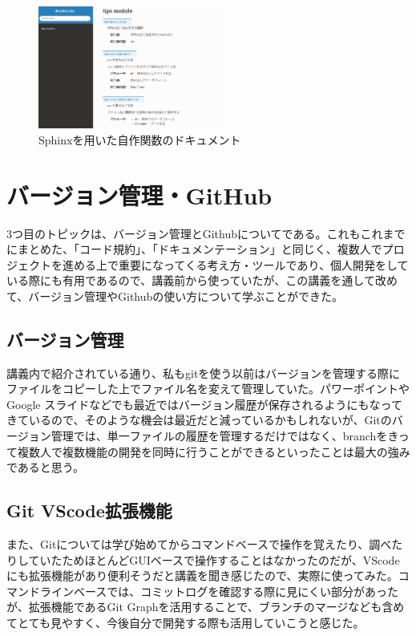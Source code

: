 \documentclass[12pt]{jsarticle}
\begin{document}
\begin{figure}[htbp]
  \begin{center}
    \includegraphics[width=6.0cm]{./sphinx.png}
    \caption{Sphinxを用いた自作関数のドキュメント}
    \label{fig:sphinx}
  \end{center}
\end{figure}



\newpage
\section{バージョン管理・GitHub}
3つ目のトピックは、バージョン管理とGithubについてである。これもこれまでにまとめた、「コード規約」、「ドキュメンテーション」と同じく、複数人でプロジェクトを進める上で重要になってくる考え方・ツールであり、個人開発をしている際にも有用であるので、講義前から使っていたが、この講義を通して改めて、バージョン管理やGithubの使い方について学ぶことができた。

\subsection{バージョン管理}
講義内で紹介されている通り、私もgitを使う以前はバージョンを管理する際にファイルをコピーした上でファイル名を変えて管理していた。パワーポイントやGoogle スライドなどでも最近ではバージョン履歴が保存されるようにもなってきているので、そのような機会は最近だと減っているかもしれないが、Gitのバージョン管理では、単一ファイルの履歴を管理するだけではなく、branchをきって複数人で複数機能の開発を同時に行うことができるといったことは最大の強みであると思う。

\subsection{Git VScode拡張機能}
また、Gitについては学び始めてからコマンドベースで操作を覚えたり、調べたりしていたためほとんどGUIベースで操作することはなかったのだが、VScodeにも拡張機能があり便利そうだと講義を聞き感じたので、実際に使ってみた。コマンドラインベースでは、コミットログを確認する際に見にくい部分があったが、拡張機能であるGit Graphを活用することで、ブランチのマージなども含めてとても見やすく、今後自分で開発する際も活用していこうと感じた。
\end{document}
